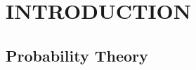 \documentclass[../main.tex]{subfiles}
\begin{document}
\section{INTRODUCTION}
\subsection{Probability Theory}
\end{document}
